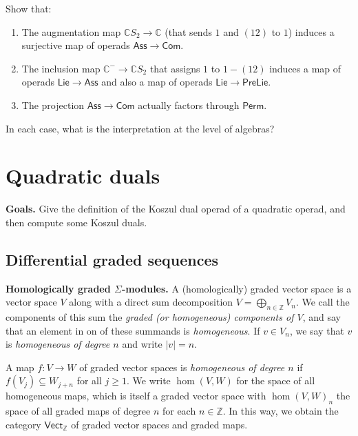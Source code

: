 \documentclass[fleqn, a4paper, twoside]{article}
\newcommand{\0}{\langle 0\rangle}
\newenvironment{tenumerate}{
 \begin{enumerate}
  \setlength{\itemsep}{0pt}
  \setlength{\parskip}{0pt}
}{\end{enumerate}}
\DeclareRobustCommand{\[}{\begin{equation}}%
\DeclareRobustCommand{\]}{\end{equation}}%
\theoremstyle{mytheorem}
\theoremstyle{introthm}
\theoremstyle{mydefinition}
\theoremstyle{mydefinition2}
\theoremstyle{plain} %
\newcommand{\?}{\,?\,}
\theoremstyle{mytheorem}
\theoremstyle{plain} %
\newcommand\blankpage{%
    \null
    \thispagestyle{empty}%
    \newpage}
\begin{document}
\begin{question}
Show that:
\begin{tenumerate}
\item The augmentation map
$\mathbb C S_2\longrightarrow \mathbb C$ (that
sends $1$ and $(12)$ to $1$) induces a surjective map of
operads $\mathsf{Ass}
\longrightarrow \mathsf{Com}$.
\item The inclusion map
$\mathbb{C}^- \longrightarrow \mathbb{C}S_2$ that assigns $1$ to 
$1-(12)$ induces a map of operads $\mathsf{Lie}\longrightarrow 
\mathsf{Ass}$ and also a map of operads $\mathsf{Lie}\longrightarrow 
\mathsf{PreLie}$.
\item The projection $\mathsf{Ass}
\longrightarrow \mathsf{Com}$ actually factors
through $\mathsf{Perm}$. 
\end{tenumerate}
In each case, what is the interpretation at the level
of algebras?
\end{question}

\afterpage{\blankpage}
\newpage

\section{Quadratic duals}\label{lecture:KD1}
\textbf{Goals.}
Give the definition of the Koszul dual
operad of a quadratic operad, and then compute
some Koszul duals.

\subsection{Differential graded sequences}


\textbf{Homologically graded $\Sigma$-modules.}
A (homologically) graded vector space is a
vector space $V$ along with a direct sum
decomposition $V = \bigoplus_{n\in\mathbb Z} V_n$.
We call the components of this sum the \emph{graded (or
homogeneous)
components of $V$}, and say that an element in 
on of these summands is \emph{homogeneous}. If
$v\in V_n$, we say that $v$ is \emph{homogeneous of
degree $n$} and write $|v|=n$. 

A map $f : V\longrightarrow W$ of graded vector spaces
is \emph{homogeneous of degree $n$} if $f(V_j)\subseteq W_{j+n}$ for
all $j\geqslant 1$. We write $\hom(V,W)$ for the
space of all homogeneous maps, which is itself a graded
vector space with $\hom(V,W)_n$ the space of all
graded maps of degree $n$ for each $n\in\mathbb Z$. 
In this way, we obtain the category $\mathsf{Vect}_\mathbb{Z}$
of graded vector spaces and graded maps. 
\end{document}
